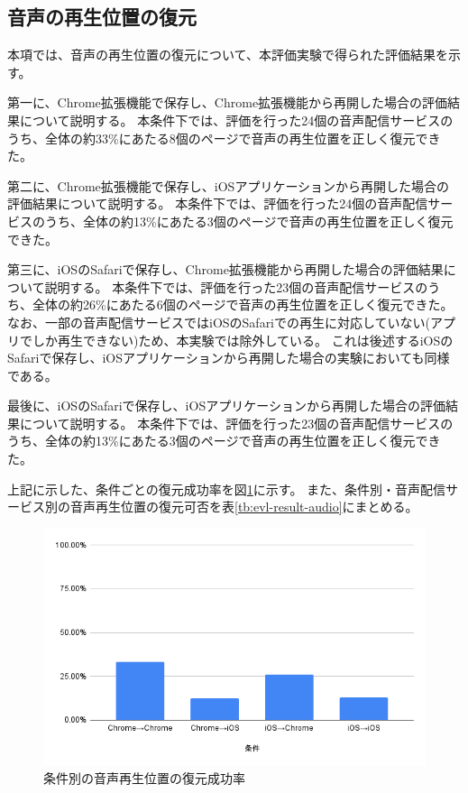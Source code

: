 
\subsection{音声の再生位置の復元}
本項では、音声の再生位置の復元について、本評価実験で得られた評価結果を示す。

第一に、Chrome拡張機能で保存し、Chrome拡張機能から再開した場合の評価結果について説明する。
本条件下では、評価を行った24個の音声配信サービスのうち、全体の約33\%にあたる8個のページで音声の再生位置を正しく復元できた。

第二に、Chrome拡張機能で保存し、iOSアプリケーションから再開した場合の評価結果について説明する。
本条件下では、評価を行った24個の音声配信サービスのうち、全体の約13\%にあたる3個のページで音声の再生位置を正しく復元できた。

第三に、iOSのSafariで保存し、Chrome拡張機能から再開した場合の評価結果について説明する。
本条件下では、評価を行った23個の音声配信サービスのうち、全体の約26\%にあたる6個のページで音声の再生位置を正しく復元できた。
なお、一部の音声配信サービスではiOSのSafariでの再生に対応していない(アプリでしか再生できない)ため、本実験では除外している。
これは後述するiOSのSafariで保存し、iOSアプリケーションから再開した場合の実験においても同様である。

最後に、iOSのSafariで保存し、iOSアプリケーションから再開した場合の評価結果について説明する。
本条件下では、評価を行った23個の音声配信サービスのうち、全体の約13\%にあたる3個のページで音声の再生位置を正しく復元できた。

上記に示した、条件ごとの復元成功率を図\ref{fig:success-rate-audio}に示す。
また、条件別・音声配信サービス別の音声再生位置の復元可否を表\ref{tb:evl-result-audio}にまとめる。

\begin{figure}[htbp]
  \label{fig:success-rate-audio}
  \begin{center}
    \includegraphics[bb=0 0 600 371,width=15cm]{img/060_evaluation/result/audio/success-rate-audio.pdf}
  \end{center}
  \caption{条件別の音声再生位置の復元成功率}
\end{figure}

